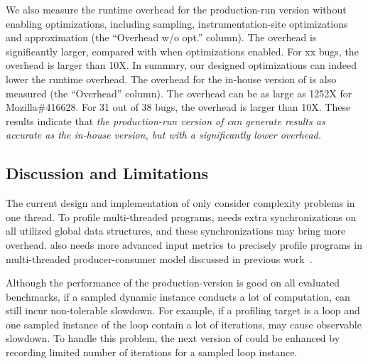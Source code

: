 We also measure the runtime overhead for the production-run 
version without enabling optimizations, 
including sampling, instrumentation-site optimizations
and approximation (the ``Overhead w/o opt.'' column). 
The overhead is significantly larger, compared with when optimizations enabled. 
For xx  bugs, the overhead is larger than 10X. 
In summary, our designed optimizations can 
indeed lower the runtime overhead. 
The overhead for the in-house version 
of \Tool is also measured 
(the ``Overhead'' column). 
The overhead can be as large as 1252X for 
Mozilla\#416628.
For 31 out of 38 bugs, the overhead is larger than 10X. 
These results indicate that \emph{the 
 production-run version of \Tool can generate results as accurate as the in-house version,
but with a significantly lower overhead. }


\subsection{Discussion and Limitations}

The current design and implementation of \Tool 
only consider complexity problems in one thread. 
To profile multi-threaded programs, 
\Tool needs extra synchronizations on all utilized global data structures, 
and these synchronizations may bring more overhead. 
\Tool also needs more advanced input metrics to precisely profile programs 
in multi-threaded producer-consumer 
model discussed in previous work~\cite{Aprof2}. 

Although the performance of the production-version 
is good on all evaluated benchmarks, 
if a sampled dynamic instance conducts a lot of computation, 
\Tool can still incur non-tolerable slowdown.
For example, if a profiling target is a loop and 
one sampled instance of the loop contain a lot of iterations, 
\Tool may cause observable slowdown. 
To handle this problem, the next version of \Tool could 
be enhanced by recording limited number of iterations for a sampled loop instance. 


